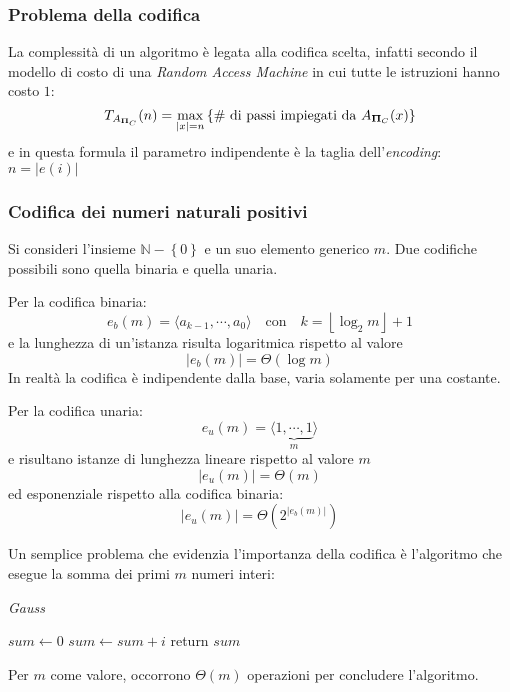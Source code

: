 \subsubsection{Problema della codifica}
La complessità di un algoritmo è legata alla codifica scelta, infatti secondo il modello di costo di una \emph{Random Access Machine} in cui tutte le istruzioni hanno costo $1$:
\begin{equation}
    T_{A_{\bm{\Pi}{}_{C}}} (n) = \max_{|x|=n} \left\{ \text{\# di passi impiegati da } A_{\bm{\Pi}{}_{C}} (x) \right\}
    \label{eq:compltaglia}
\end{equation}
e in questa formula il parametro indipendente è la taglia dell'\emph{encoding}: $n=|e(i)|$

\subsubsection{Codifica dei numeri naturali positivi}
Si consideri l'insieme $\mathbb{N} - \left\{ 0 \right\}$ e un suo elemento generico $m$. Due codifiche possibili sono quella binaria e quella unaria.

Per la codifica binaria:
\begin{equation*}
    e_b (m) = \langle a_{k-1}, \cdots, a_0  \rangle \quad \text{con} \quad k = \left\lfloor \log_2 m \right\rfloor + 1
\end{equation*}
e la lunghezza di un'istanza risulta logaritmica rispetto al valore
\begin{equation*}
    |e_b(m)| = \Theta \left( \log m \right)
\end{equation*}
In realtà la codifica è indipendente dalla base, varia solamente per una costante.

Per la codifica unaria:
\begin{equation*}
    e_u (m) = \langle  \underbrace{1, \cdots, 1}_m  \rangle
\end{equation*}
e risultano istanze di lunghezza lineare rispetto al valore $m$
\begin{equation}
    |e_u(m)| = \Theta \left( m \right)
    \label{eq:coduncomp}
\end{equation}
ed esponenziale rispetto alla codifica binaria:
\begin{equation*}
    |e_u(m)| = \Theta \left( 2^{|e_b(m)|} \right)
\end{equation*}

Un semplice problema che evidenzia l'importanza della codifica è l'algoritmo che esegue la somma dei primi $m$ numeri interi:
\begin{algorithm}[H]
\caption{\emph{Gauss}}\label{alg:gauss}
\begin{algorithmic}[1]
        \State $sum \gets 0$
            \State $sum \gets sum + i$
        \EndFor
        \State return $sum$
    \EndProcedure
\end{algorithmic}
\end{algorithm}
Per $m$ come valore, occorrono $\Theta \left( m \right)$ operazioni per concludere l'algoritmo.

